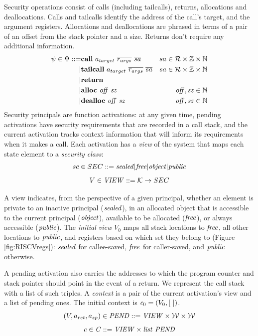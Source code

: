 \documentclass[10pt,conference]{ieeetran}%
\theoremstyle{definition}
\begin{document}
Security operations consist of calls (including tailcalls), returns,
allocations and deallocations. Calls and tailcalls identify the address of the call's target,
and the argument registers. Allocations and deallocations are phrased in terms of a pair
of an offset from the stack pointer and a size. Returns don't require any additional information.
%
\begin{align*}
  \psi \in \Psi ::= & \mathbf{call} ~ a_{target} ~ \overline{r_{args}} ~ \overline{sa} &
  sa \in {\mathcal R} \times \mathbb{Z} \times \mathbb{N} \\
  | & \mathbf{tailcall} ~ a_{target}  ~ \overline{r_{args}} ~ \overline{sa} &
  sa \in {\mathcal R} \times \mathbb{Z} \times \mathbb{N} \\
  | & \mathbf{return} & \\
  | & \mathbf{alloc} ~ \mathit{off ~ sz} & \mathit{off, sz} \in \mathbb{N} \\
  | & \mathbf{dealloc} ~ \mathit{off ~ sz} & \mathit{off, sz} \in \mathbb{N} \\
\end{align*}
%
Security principals are function activations: at any given time, pending activations
have security requirements that are recorded in a call stack, and the current
activation tracks context information that will inform its requirements when
it makes a call. Each activation has a {\it view}
of the system that maps each state element to a {\it security class}:
\[sc \in SEC ::= \mathit{sealed} | \mathit{free} | \mathit{object} | \mathit{public}\]
\[V \in \mathit{VIEW} ::= {\mathcal K} \rightarrow SEC\]

A view indicates, from the perspective of a given principal, whether an element is
private to an inactive principal (\(\mathit{sealed}\)),
in an allocated object that is accessible to the current principal (\(\mathit{object}\)),
available to be allocated (\(\mathit{free}\)), or
always accessible (\(\mathit{public}\)).
The {\it initial view} \(V_0\) maps all stack locations to \(\mathit{free}\),
all other locations to \(\mathit{public}\), and registers based on which set they
belong to (Figure \ref{fig:RISCVregs}): \(\mathit{sealed}\) for callee-saved,
\(\mathit{free}\) for caller-saved, and \(\mathit{public}\) otherwise.

A pending activation also carries the addresses to which the program counter
and stack pointer should point in the event of a return. We represent the call
stack with a list of such triples. A {\it context} is a pair of the current activation's view
and a list of pending ones.
The initial context is \(\mathit{c}_0 = (V_0, [ ~ ])\).
\[(V, a_{ret}, a_{sp}) \in \mathit{PEND} ::= \mathit{VIEW \times {\mathcal W} \times {\mathcal W}}\]
\[\mathit{c} \in \mathit{C} ::= \mathit{VIEW \times list ~ PEND}\]
\end{document}
